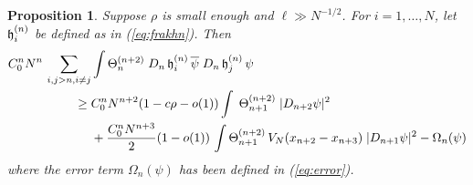 \documentclass[11pt]{article}
\newtheorem{proposition}[theorem]{Proposition}
\newcommand{\fh}{{\frak h}}
\begin{document}
\begin{proposition}\label{lm:Hk-1}
Suppose $\rho$ is small enough and $\ell \gg N^{-1/2}$.
 For $i=1,
\dots,N$, let $\fh^{(n)}_i$ be defined as in (\ref{eq:frakhn}). Then
\begin{equation}\label{eq:lmHk-1}
\begin{split}
C_0^n N^n \, \sum_{i,j > n, i\neq j} &\int \Theta^{(n+2)}_n \; D_n
\, \fh^{(n)}_i \, \overline{\psi} \; D_n \, \fh^{(n)}_j \, \psi
\\ \geq \; &C_0^n N^{n+2} (1- c\rho-o(1)) \int \;
\Theta^{(n+2)}_{n+1} \; |D_{n+2} \psi|^2
\\ &+ \frac{C_0^n N^{n+3}}{2} (1-o(1)) \,
\int \Theta^{(n+2)}_{n+1} \, V_N (x_{n+2} -x_{n+3}) \; |D_{n+1}
\psi|^2 -\Omega_n (\psi)
\end{split}
\end{equation}
where the error term $\Omega_n (\psi)$ has been defined in
(\ref{eq:error}).
\end{proposition}
\end{document}
